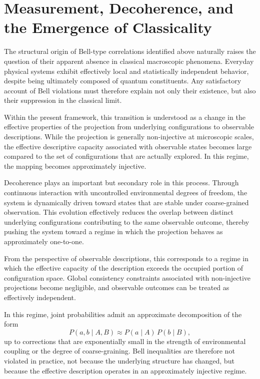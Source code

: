 \section{Measurement, Decoherence, and the Emergence of Classicality}
  \label{sec:classical-limit}

  The structural origin of Bell-type correlations identified above naturally raises
  the question of their apparent absence in classical macroscopic phenomena.
  Everyday physical systems exhibit effectively local and statistically independent
  behavior, despite being ultimately composed of quantum constituents.
  Any satisfactory account of Bell violations must therefore explain not only their
  existence, but also their suppression in the classical limit.

  Within the present framework, this transition is understood as a change in the
  effective properties of the projection from underlying configurations to observable
  descriptions.
  While the projection is generally non-injective at microscopic scales, the effective
  descriptive capacity associated with observable states becomes large compared to the
  set of configurations that are actually explored.
  In this regime, the mapping becomes approximately injective.

  Decoherence plays an important but secondary role in this process.
  Through continuous interaction with uncontrolled environmental degrees of freedom,
  the system is dynamically driven toward states that are stable under coarse-grained
  observation.
  This evolution effectively reduces the overlap between distinct underlying
  configurations contributing to the same observable outcome, thereby pushing the
  system toward a regime in which the projection behaves as approximately one-to-one.

  From the perspective of observable descriptions, this corresponds to a regime in
  which the effective capacity of the description exceeds the occupied portion of
  configuration space.
  Global consistency constraints associated with non-injective projections become
  negligible, and observable outcomes can be treated as effectively independent.

  In this regime, joint probabilities admit an approximate decomposition of the form
  \begin{equation}
    P(a,b \mid A,B) \approx P(a \mid A)\,P(b \mid B),
  \end{equation}
  up to corrections that are exponentially small in the strength of environmental
  coupling or the degree of coarse-graining.
  Bell inequalities are therefore not violated in practice, not because the underlying
  structure has changed, but because the effective description operates in an
  approximately injective regime.

